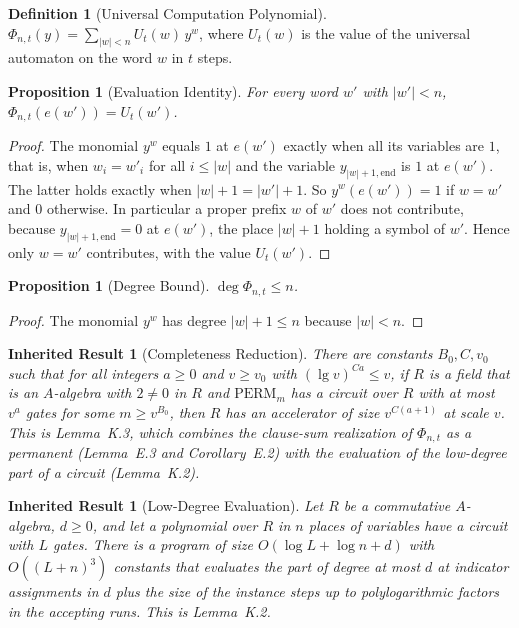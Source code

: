 \documentclass[11pt,letterpaper]{report}
\theoremstyle{plain}
\newtheorem{proposition}[theorem]{Proposition}
\newtheorem{inherited}[theorem]{Inherited Result}
\theoremstyle{definition}
\newtheorem{definition}[theorem]{Definition}
\theoremstyle{remark}
\begin{document}
\begin{definition}[Universal Computation Polynomial]
$\Phi_{n,t}(y)=\sum_{|w|<n}U_t(w)\,y^w$, where $U_t(w)$ is the value of the universal automaton on the word $w$ in $t$ steps.
\end{definition}

\begin{proposition}[Evaluation Identity]\label{pr:evalid}
For every word $w'$ with $|w'|<n$, $\Phi_{n,t}(e(w'))=U_t(w')$.
\end{proposition}
\begin{proof}
The monomial $y^w$ equals $1$ at $e(w')$ exactly when all its variables are $1$, that is, when $w_i=w'_i$ for all $i\le|w|$ and the variable $y_{|w|+1,\mathrm{end}}$ is $1$ at $e(w')$. The latter holds exactly when $|w|+1=|w'|+1$. So $y^w(e(w'))=1$ if $w=w'$ and $0$ otherwise. In particular a proper prefix $w$ of $w'$ does not contribute, because $y_{|w|+1,\mathrm{end}}=0$ at $e(w')$, the place $|w|+1$ holding a symbol of $w'$. Hence only $w=w'$ contributes, with the value $U_t(w')$.
\end{proof}

\begin{proposition}[Degree Bound]
$\deg\Phi_{n,t}\le n$.
\end{proposition}
\begin{proof}
The monomial $y^w$ has degree $|w|+1\le n$ because $|w|<n$.
\end{proof}

\begin{inherited}[Completeness Reduction]\label{inh:compred}
There are constants $B_0,C,v_0$ such that for all integers $a\ge0$ and $v\ge v_0$ with $(\lg v)^{Ca}\le v$, if $R$ is a field that is an $A$-algebra with $2\ne0$ in $R$ and $\mathrm{PERM}_m$ has a circuit over $R$ with at most $v^a$ gates for some $m\ge v^{B_0}$, then $R$ has an accelerator of size $v^{C(a+1)}$ at scale $v$. This is Lemma~K.3, which combines the clause-sum realization of $\Phi_{n,t}$ as a permanent (Lemma~E.3 and Corollary~E.2) with the evaluation of the low-degree part of a circuit (Lemma~K.2).
\end{inherited}

\begin{inherited}[Low-Degree Evaluation]
Let $R$ be a commutative $A$-algebra, $d\ge0$, and let a polynomial over $R$ in $n$ places of variables have a circuit with $L$ gates. There is a program of size $O(\log L+\log n+d)$ with $O((L+n)^3)$ constants that evaluates the part of degree at most $d$ at indicator assignments in $d$ plus the size of the instance steps up to polylogarithmic factors in the accepting runs. This is Lemma~K.2.
\end{inherited}
\end{document}
